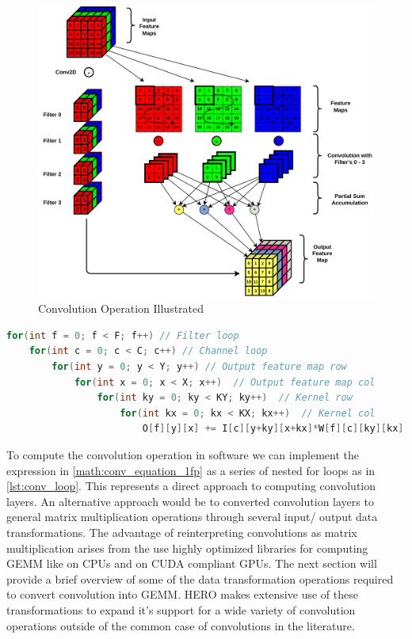 \begin{figure}[ht]
    \centering
    \includegraphics[scale=0.6]{fig/ConvExplained.pdf}
    \caption{Convolution Operation Illustrated}
    \label{fig:conv_explained}
\end{figure}

\begin{minipage}{\linewidth}
    \begin{lstlisting}[language=C, caption=Convolution implemented as nested loops, label={lst:conv_loop}]
for(int f = 0; f < F; f++) // Filter loop
    for(int c = 0; c < C; c++) // Channel loop
        for(int y = 0; y < Y; y++) // Output feature map row
            for(int x = 0; x < X; x++)  // Output feature map col
                for(int ky = 0; ky < KY; ky++)  // Kernel row
                    for(int kx = 0; kx < KX; kx++)  // Kernel col
                        O[f][y][x] += I[c][y+ky][x+kx]*W[f][c][ky][kx];
    \end{lstlisting}
\end{minipage}

To compute the convolution operation in software we can implement the expression
in \autoref{math:conv_equation_1fp} as a series of nested for loops as in
\autoref{lst:conv_loop}. This represents a direct approach to computing
convolution layers. An alternative approach would be to converted convolution
layers to general matrix multiplication operations through several input/ output
data transformations. The advantage of reinterpreting convolutions as matrix
multiplication arises from the use highly optimized libraries for computing GEMM
like \cite{blas} on CPUs and \cite{cuBLAS} on CUDA compliant GPUs. The next
section will provide a brief overview of some of the data transformation
operations required to convert convolution into GEMM. HERO makes extensive use
of these transformations to expand it's support for a wide variety of
convolution operations outside of the common case of convolutions in the
literature. 

